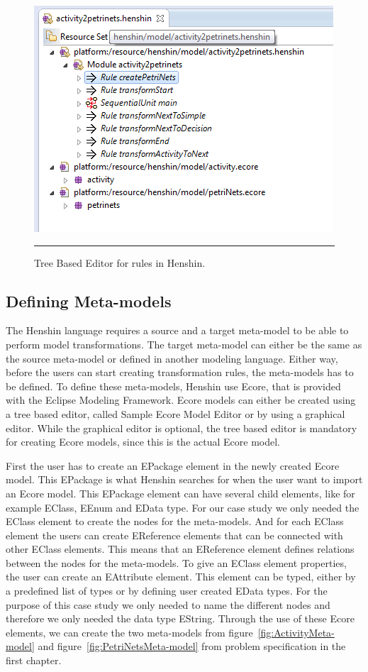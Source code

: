 \begin{figure}[H]
	\centering
	\includegraphics[scale=0.7]{figures/Henshin_TreeEdtiro.png}
	\rule{35em}{0.5pt}
	\caption[The Henshin Model Editor]
	{Tree Based Editor for rules in Henshin.}
	\label{fig:Henshin_TreeEditor}
\end{figure}

\subsection{Defining Meta-models}

The Henshin language requires a source and a target meta-model to be able to
perform model transformations. The target meta-model can either be the same as
the source meta-model or defined in another modeling language. Either way, before
the users can start creating transformation rules, the meta-models has
to be defined. To define these meta-models, Henshin use Ecore, that is
provided with the Eclipse Modeling Framework\cite{Steinberg2009}. Ecore models
can either be created using a tree based editor, called Sample Ecore Model
Editor or by using a graphical editor. While the graphical editor is optional,
the tree based editor is mandatory for creating Ecore models, since this is the
actual Ecore model. 

First the user has to create an EPackage element in the newly created Ecore
model. This EPackage is what Henshin searches for when the user want to import
an Ecore model. This EPackage element can have several child elements, like for
example EClass, EEnum and EData type. For our case study we only needed the
EClass element to create the nodes for the meta-models. And for each EClass
element the users can create EReference elements that can be connected with
other EClass elements. This means that an EReference element defines relations
between the nodes for the meta-models. To give an EClass element properties, the
user can create an EAttribute element. This element can be typed, either by a
predefined list of types or by defining user created EData types. For the
purpose of this case study we only needed to name the different nodes and
therefore we only needed the data type EString. Through the use of these Ecore
elements, we can create the two meta-models from
figure~\ref{fig:ActivityMeta-model} and figure~\ref{fig:PetriNetsMeta-model} from
problem specification in the first chapter.


